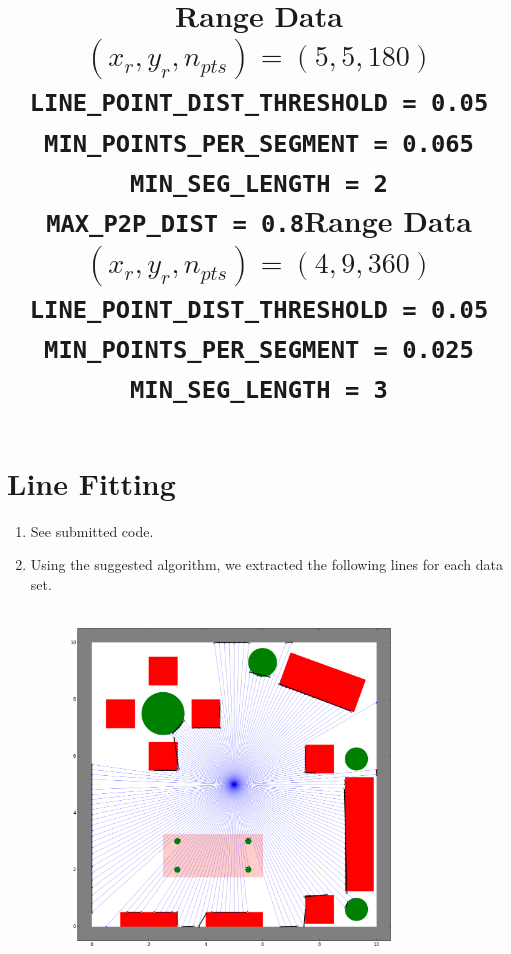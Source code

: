 \documentclass[12pt]{article}
\begin{document}
\section{Line Fitting}
\begin{enumerate}
	\item See submitted code.
	\item Using the suggested algorithm, we extracted the following lines for each data set.
	\begin{figure}[H]
		\centering
		\title{\bf Range Data $(x_r, y_r, n_{pts}) = (5,5,180)$ \\ \vspace{2.5mm}
			\verb|LINE_POINT_DIST_THRESHOLD = 0.05| \\
			\verb|MIN_POINTS_PER_SEGMENT = 0.065| \\
			\verb|MIN_SEG_LENGTH = 2| \\
			\verb|MAX_P2P_DIST = 0.8|}
		\\ \vspace{5mm}
		\includegraphics[width=0.8\textwidth]{../Figures/hw2_2_ii_55180.png}
	\end{figure}
	\begin{figure}[H]
		\centering
		\title{\bf Range Data $(x_r, y_r, n_{pts}) = (4,9,360)$ \\ \vspace{2.5mm}
			\verb|LINE_POINT_DIST_THRESHOLD = 0.05| \\
			\verb|MIN_POINTS_PER_SEGMENT = 0.025| \\
			\verb|MIN_SEG_LENGTH = 3| \\
}
\end{figure}
\end{enumerate}
\end{document}
